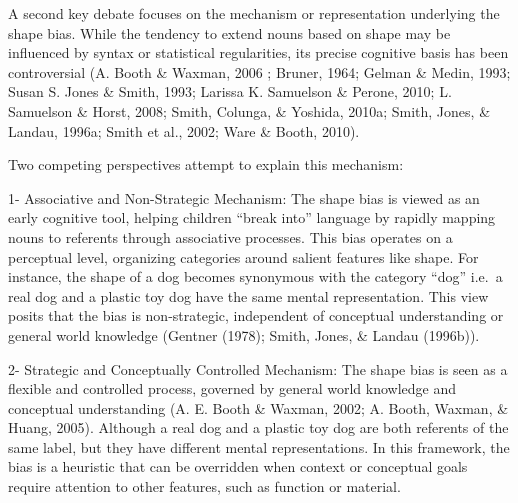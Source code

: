 \documentclass[10pt, letterpaper]{article}
\begin{document}
A second key debate focuses on the mechanism or representation
underlying the shape bias. While the tendency to extend nouns based on
shape may be influenced by syntax or statistical regularities, its
precise cognitive basis has been controversial (A. Booth \& Waxman, 2006
; Bruner, 1964; Gelman \& Medin, 1993; Susan S. Jones \& Smith, 1993;
Larissa K. Samuelson \& Perone, 2010; L. Samuelson \& Horst, 2008;
Smith, Colunga, \& Yoshida, 2010a; Smith, Jones, \& Landau, 1996a; Smith
et al., 2002; Ware \& Booth, 2010).

Two competing perspectives attempt to explain this mechanism:

1- Associative and Non-Strategic Mechanism: The shape bias is viewed as
an early cognitive tool, helping children ``break into'' language by
rapidly mapping nouns to referents through associative processes. This
bias operates on a perceptual level, organizing categories around
salient features like shape. For instance, the shape of a dog becomes
synonymous with the category ``dog'' i.e.~a real dog and a plastic toy
dog have the same mental representation. This view posits that the bias
is non-strategic, independent of conceptual understanding or general
world knowledge (Gentner (1978); Smith, Jones, \& Landau (1996b)).

2- Strategic and Conceptually Controlled Mechanism: The shape bias is
seen as a flexible and controlled process, governed by general world
knowledge and conceptual understanding (A. E. Booth \& Waxman, 2002; A.
Booth, Waxman, \& Huang, 2005). Although a real dog and a plastic toy
dog are both referents of the same label, but they have different mental
representations. In this framework, the bias is a heuristic that can be
overridden when context or conceptual goals require attention to other
features, such as function or material.
\end{document}
